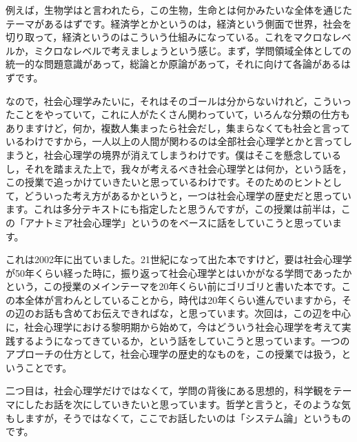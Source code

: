 \documentclass{ltjsbook}
\begin{document}
例えば，生物学はと言われたら，この生物，生命とは何かみたいな全体を通じたテーマがあるはずです。経済学とかというのは，経済という側面で世界，社会を切り取って，経済というのはこういう仕組みになっている。これをマクロなレベルか，ミクロなレベルで考えましょうという感じ。まず，学問領域全体としての統一的な問題意識があって，総論とか原論があって，それに向けて各論があるはずです。

なので，社会心理学みたいに，それはそのゴールは分からないけれど，こういったことをやっていて，これに人がたくさん関わっていて，いろんな分類の仕方もありますけど，何か，複数人集まったら社会だし，集まらなくても社会と言っているわけですから，一人以上の人間が関わるのは全部社会心理学とかと言ってしまうと，社会心理学の境界が消えてしまうわけです。僕はそこを懸念しているし，それを踏まえた上で，我々が考えるべき社会心理学とは何か，という話を，この授業で追っかけていきたいと思っているわけです。そのためのヒントとして，どういった考え方があるかというと，一つは社会心理学の歴史だと思っています。これは多分テキストにも指定したと思うんですが，この授業は前半は，この「アナトミア社会心理学」というのをベースに話をしていこうと思っています\parencite{anatomia}。

これは2002年に出ていました。21世紀になって出た本ですけど，要は社会心理学が50年くらい経った時に，振り返って社会心理学とはいかがなる学問であったかという，この授業のメインテーマを20年くらい前にゴリゴリと書いた本です。この本全体が言わんとしていることから，時代は20年くらい進んでいますから，その辺のお話も含めてお伝えできればな，と思っています。次回は，この辺を中心に，社会心理学における黎明期から始めて，今はどういう社会心理学を考えて実践するようになってきているか，という話をしていこうと思っています。一つのアプローチの仕方として，社会心理学の歴史的なものを，この授業では扱う，ということです。

二つ目は，社会心理学だけではなくて，学問の背後にある思想的，科学観をテーマにしたお話を次にしていきたいと思っています。哲学と言うと，そのような気もしますが，そうではなくて，ここでお話したいのは「システム論」というものです。
\end{document}
